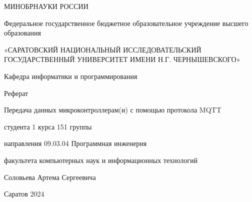 

	\begin{center}
		МИНОБРНАУКИ РОССИИ
		  
		Федеральное государственное бюджетное образовательное учреждение высшего образования
		
		«САРАТОВСКИЙ НАЦИОНАЛЬНЫЙ ИССЛЕДОВАТЕЛЬСКИЙ ГОСУДАРСТВЕННЫЙ УНИВЕРСИТЕТ ИМЕНИ Н.Г. ЧЕРНЫШЕВСКОГО»
		
	\end{center}

\vspace{2 cm}

\begin{flushright}
	Кафедра информатики и программирования
\end{flushright}

\vspace{2 cm}

\begin{center}
	Реферат
	
	Передача данных микроконтроллерам(и) с помощью протокола MQTT
\end{center}
\vspace{5 cm}
\begin{flushleft}
	студента 1 курса 151 группы
	
	направления 09.03.04 Программная инженерия
	
	факультета компьютерных наук и информационных технологий
	
	Соловьева Артема Сергеевича 
	
\end{flushleft}

\vspace{7 cm}
\begin{center}
	Саратов 2024
	
	
\end{center}
\newpage

\tableofcontents



\newpage